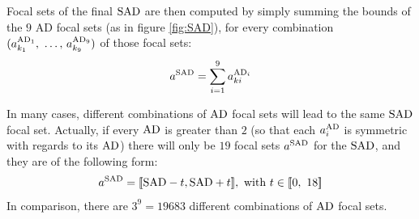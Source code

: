 Focal sets of the final ${\mathrm{SAD}}$ are then computed by simply summing the bounds of the $9$ AD focal sets (as in figure \ref{fig:SAD}), for every combination $(a^{{\mathrm{AD}}_1}_{k_1}{, ~\dots, ~} a^{{\mathrm{AD}}_9}_{k_9})$ of those focal sets:
\begin{align}
    a^{\mathrm{SAD}}=\sum_{i=1}^9a^{{\mathrm{AD}}_i}_{ki}
\end{align}

\begin{remark}
    In many cases, different combinations of ${\mathrm{AD}}$ focal sets will lead to the same ${\mathrm{SAD}}$ focal set. Actually, if every ${\mathrm{AD}}$ is greater than $2$ (so that each $a^{\mathrm{AD}}_i$ is symmetric with regards to its ${\mathrm{AD}}$) there will only be $19$ focal sets $a^{\mathrm{SAD}}$ for the ${\mathrm{SAD}}$, and they are of the following form:
    \begin{align}\label{eq:nested_SAD}
        a^{\mathrm{SAD}} = {[\![}{\mathrm{SAD}}-t,{\mathrm{SAD}}+t{]\!]},\text{ with }t\in{[\![}0, ~18{]\!]}
    \end{align}
    In comparison, there are $3^9=19683$ different combinations of ${\mathrm{AD}}$ focal sets.
\end{remark}

